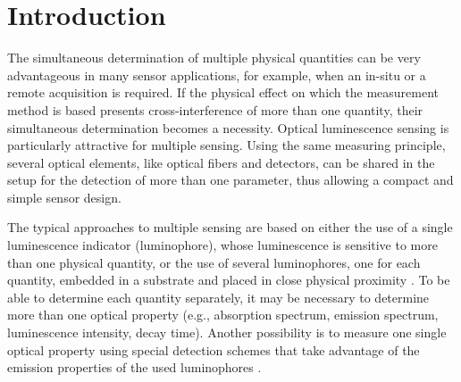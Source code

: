 \documentclass[sensors,article,submit,moreauthors,pdftex,10pt,a4paper]{Definitions/mdpi}
\begin{document}


\section{Introduction}
\label{Introduction}

The simultaneous determination of multiple physical quantities can be very advantageous in many sensor applications, for example, when an in-situ or a remote acquisition is required. 
If the physical effect on which the measurement method is based presents cross-interference of more than one quantity, their simultaneous determination becomes a necessity.
Optical luminescence sensing is particularly attractive for multiple sensing. Using the same measuring principle, several optical elements, like optical fibers and detectors, can be shared in the setup for the detection of more than one parameter, thus allowing a compact and simple sensor design.

The typical approaches to multiple sensing are based on either the use of a single luminescence indicator (luminophore), whose luminescence is sensitive to more than one physical quantity, or the use of several luminophores, one for each quantity, embedded in a substrate and placed in close physical proximity \cite{Stich2010,Borisov2011novel,Kameya2014,Wang2014,Santoro2016,Biring2019}. To be able to determine each quantity separately, it may be necessary to determine more than one optical property (e.g., absorption spectrum, emission spectrum, luminescence intensity, decay time). Another possibility is to measure one single optical property using special detection schemes that take advantage of the emission properties of the used luminophores \cite{Wang2014,Biring2019,Collier2013,Stehning2004,Jorge2008,Moore2006}. 
\end{document}
